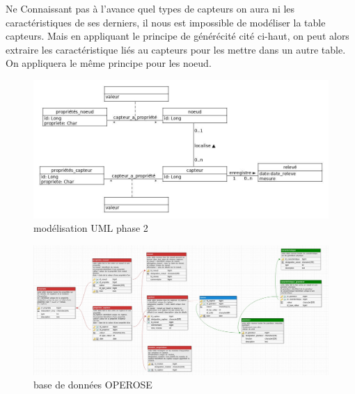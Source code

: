 Ne Connaissant pas à l'avance quel types de capteurs on aura ni les caractéristiques de ses derniers, il nous est impossible de modéliser la table capteurs. Mais en appliquant le principe de générécité cité ci-haut, on peut alors extraire les caractéristique liés au capteurs pour les mettre dans un autre table. On appliquera le même principe pour les noeud.
\begin{figure}[!h]
   \begin{center}
        \includegraphics[width=1\textwidth]{images/uml_image2.jpg}
    \caption{modélisation UML phase 2}
    \label{fig:modélisation UML phase 2}
   \end{center}
\end{figure}



\begin{landscape}
\begin{figure}
   \begin{center}
       \includegraphics[width=1.8\textwidth]{images/bd_image3.jpg}
    \caption{base de données OPEROSE}
     \label{base de données OPEROSE}
   \end{center}
\end{figure}
\end{landscape}




